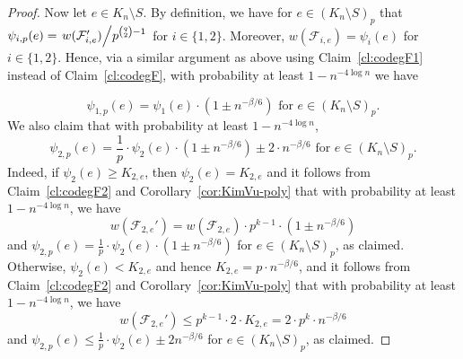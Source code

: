 \documentclass[11pt]{article}
\def\COMMENT#1{}
\numberwithin{equation}{section}
\newcounter{i}
\theoremstyle{plain}
\theoremstyle{plain} %
\theoremstyle{definition}
\newcommand{\cF}{\mathcal{F}}
\begin{document}
\begin{proof}
Now let $e \in K_n\setminus S$.
By definition, we have for $e \in (K_n \setminus S)_p$ that $\psi_{i,p}(e) = \left.w(\cF_{i,e}')\middle/p^{\binom{q}{2}-1}\right.$ for $i \in \{1,2\}$.  Moreover, $w(\cF_{i,e}) = \psi_i(e)$ for $i \in \{1,2\}$.  Hence, via a similar argument as above using Claim~\ref{cl:codegF1} instead of Claim~\ref{cl:codegF}, with probability at least $1 - n^{-4\log n}$ we have
\COMMENT{It follows from Claim~\ref{cl:codegF1} and Corollary~\ref{cor:KimVu-poly} applied to $\cF_{1,e}$ with $n^2$ playing the role of $n$ and $\beta / 4$ playing the role of $\beta$, that with probability at least $1-n^{-4\log n}$, we have
$$w(\cF_{1,e}') = w(\cF_{1,e})\cdot p^k \cdot \left(1\pm n^{-\beta/6}\right).$$
By definition, we have for $e\in (K_n\setminus S)_p$ that $\psi_{1,p}(e) = \left.w(\cF_{1,e}')\middle / {p^{\binom{q}{2}-1}}\right.$, and recall that $w(\cF_{1,e})=\psi_1(e)$.}
\begin{equation}\label{psi_1-concentration}
    \psi_{1,p}(e) = \psi_{1}(e)\cdot \left(1\pm n^{-\beta/6}\right) \text{ for } e \in (K_n\setminus S)_p.
\end{equation}
We also claim that with probability at least $1 - n^{-4\log n}$,
\begin{equation}\label{psi_2-concentration}
    \psi_{2,p}(e) = \frac{1}{p}\cdot \psi_{2}(e)\cdot \left(1\pm n^{-\beta/6}\right) \pm 2\cdot n^{-\beta/6} \text{ for } e \in (K_n\setminus S)_p.
\end{equation}
Indeed, if $\psi_2(e) \geq K_{2,e}$, then $\psi_{2}(e) = K_{2,e}$ and it follows from Claim~\ref{cl:codegF2} and Corollary~\ref{cor:KimVu-poly} that with probability at least $1-n^{-4\log n}$, we have
$$w(\cF_{2,e}') = w(\cF_{2,e})\cdot p^{k-1} \cdot \left(1\pm n^{-\beta/6}\right)$$
and $\psi_{2,p}(e) = \frac{1}{p}\cdot \psi_2(e) \cdot \left(1\pm n^{-\beta/6}\right)$ for $e \in (K_n\setminus S)_p$, as claimed.  
Otherwise, $\psi_2(e) < K_{2,e}$ and hence $K_{2,e} = p\cdot n^{-\beta/6}$, and
it follows from Claim~\ref{cl:codegF2} and  Corollary~\ref{cor:KimVu-poly} that with probability at least $1-n^{-4\log n}$, we have
$$w(\cF_{2,e}') \le p^{k-1} \cdot 2\cdot K_{2,e} = 2\cdot p^{k}\cdot n^{-\beta/6}$$
and $\psi_{2,p}(e) \leq \frac{1}{p}\cdot\psi_2(e) \pm 2n^{-\beta / 6}$ for $e \in (K_n\setminus S)_p$\COMMENT{using that $\frac{1}{p}\psi_2(e) \leq {K_{2,e}}/{p} = n^{-\beta / 6}$ and $w(\cF_{2,e}')\ge 0$}, as claimed.


\end{proof}
\end{document}
